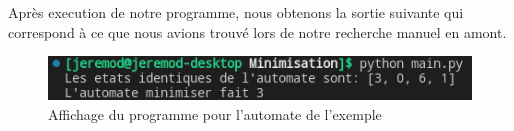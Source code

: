 \documentclass[a4paper]{article}
\begin{document}
Après execution de notre programme, nous obtenons la sortie suivante qui correspond à ce
que nous avions trouvé lors de notre recherche manuel en amont.

\begin{figure}[!h]
	\centering
	\includegraphics[scale=0.5]{src/resultat_auto1.png}
	\caption{Affichage du programme pour l'automate de l'exemple}
\end{figure}
\end{document}
